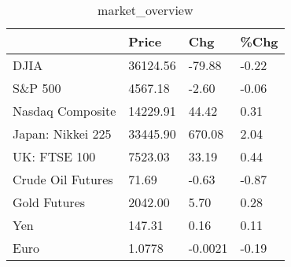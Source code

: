 \documentclass{article}%
\begin{document}
%


\begin{table}[htbp]%
\caption{market\_overview}%
\centering%
\begin{adjustbox}{width=1\textwidth}%
\begin{tabular}{llll}
\toprule
                  &    Price &     Chg &  \%Chg \\
\midrule
             DJIA & 36124.56 &  -79.88 & -0.22 \\
          S\&P 500 &  4567.18 &   -2.60 & -0.06 \\
 Nasdaq Composite & 14229.91 &   44.42 &  0.31 \\
Japan: Nikkei 225 & 33445.90 &  670.08 &  2.04 \\
     UK: FTSE 100 &  7523.03 &   33.19 &  0.44 \\
Crude Oil Futures &    71.69 &   -0.63 & -0.87 \\
     Gold Futures &  2042.00 &    5.70 &  0.28 \\
              Yen &   147.31 &    0.16 &  0.11 \\
             Euro &   1.0778 & -0.0021 & -0.19 \\
\bottomrule
\end{tabular}
%
\end{adjustbox}%
\end{table}

%
\end{document}
